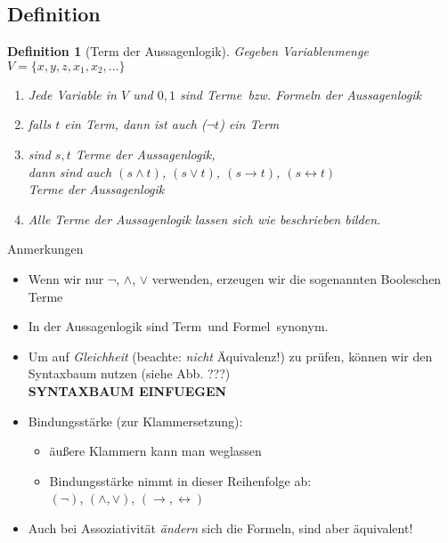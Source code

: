 \documentclass[10pt,a4paper]{article}
\begin{document}
\subsection{Definition}
\newtheorem{defi}{Definition}
\begin{defi}[Term der Aussagenlogik]
Gegeben Variablenmenge $V = \{ x,y,z,x_1,x_2, ...\} $
\begin{enumerate}
\item Jede Variable in $V$ und $0,1$ sind \glq Terme\grq\ bzw. Formeln der Aussagenlogik
\item falls $t$ ein Term, dann ist auch ($\neg t$) ein Term
\item sind $s,t$ Terme der Aussagenlogik, \\
dann sind auch $(s \land t)$, $(s \lor t)$, $(s\rightarrow t)$, $(s\leftrightarrow t)$ \\
Terme der Aussagenlogik
\item Alle Terme der Aussagenlogik lassen sich wie beschrieben bilden.
\end{enumerate}
\end{defi}
%
Anmerkungen
\begin{itemize}
\item Wenn wir nur $\neg$, $\land$, $\lor$ verwenden, erzeugen wir die sogenannten \glq Booleschen Terme\grq
\item In der Aussagenlogik sind \glq Term\grq\ und \glq Formel\grq\ synonym.
\item Um auf \emph{Gleichheit} (beachte: \emph{nicht} Äquivalenz!) zu prüfen, können wir den Syntaxbaum nutzen (siehe Abb. ???)
\\ \textbf{SYNTAXBAUM EINFUEGEN}
\item Bindungsstärke (zur Klammersetzung):
\begin{itemize}
\item äußere Klammern kann man weglassen
\item Bindungsstärke nimmt in dieser Reihenfolge ab: \\
$(\neg)$, $(\land,\lor)$, $(\rightarrow, \leftrightarrow)$
\end{itemize}
\item Auch bei Assoziativität \emph{ändern} sich die Formeln, sind aber äquivalent!
\end{itemize}
\end{document}

